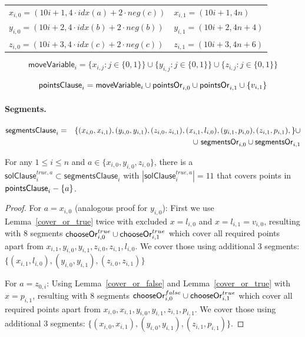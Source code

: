 \begin{center}
\begin{tabular}{ l l }
	$x_{i, 0} = (10i+1, 4\cdot idx(a) + 2\cdot neg(c))$ &
	$x_{i, 1} = (10i+1, 4n)$ \\
	$y_{i, 0} = (10i+2, 4\cdot idx(b) + 2\cdot neg(b))$ &
	$y_{i, 1} = (10i+2, 4n + 4)$ \\
	$z_{i, 0} = (10i+3, 4\cdot idx(c) + 2\cdot neg(c))$ &
	$z_{i, 1} = (10i+3, 4n + 6)$
\end{tabular}
\end{center}

\newcommand{\segmentsClause}{\mathsf{segmentsClause}}	
 
 $$\mathsf{moveVariable}_i = 
 \{x_{i, j} : j \in \{0, 1\}\} \cup
 \{y_{i, j} : j \in \{0, 1\}\} \cup
 \{z_{i, j} : j \in \{0, 1\}\} 
 $$
 
 $$\mathsf{pointsClause}_i = 
 \mathsf{moveVariable}_i \cup \mathsf{pointsOr}_{i,0}
 \cup \mathsf{pointsOr}_{i,1} \cup \{v_{i, 1} \} 
 $$

\paragraph{Segments.}

\begin{eqnarray*}
\segmentsClause_i & = & \{ (x_{i, 0}, x_{i, 1}),
(y_{i, 0}, y_{i, 1}),
(z_{i, 0}, z_{i, 1}),
(x_{i, 1}, l_{i, 0}),
(y_{i, 1}, p_{i, 0}),
(z_{i, 1}, p_{i, 1}),
\} \cup \\
& & \cup \ \segmentsOr{i}{0} \cup \segmentsOr{i}{1}
\end{eqnarray*}

\newcommand{\segmentsClauseSolTrue}[1]{\mathsf{solClause}^{true,#1}}
\newcommand{\segmentsClauseSolFalse}{\mathsf{solClause}^{false}}

\begin{lemma}
\label{cover_clauses_solution_true}
For any $1 \le i \le n$ and $a \in \{ x_{i, 0}, y_{i, 0}, z_{i, 0}\}$,
there is a $\segmentsClauseSolTrue{a}_i \subset \segmentsClause_i$
with $|\segmentsClauseSolTrue{a}_i| = 11$
that covers points in $\mathsf{pointsClause}_i - \{a\}$.
\end{lemma}

\begin{proof}
For $a = x_{i, 0}$ (analogous proof for $y_{i, 0}$):
First we use Lemma~\ref{cover_or_true} twice with excluded $x = l_{i, 0}$ and
$x = l_{i, 1} = v_{i, 0}$,
resulting with 8 segments $\mathsf{chooseOr}^{true}_{i,0} \cup \mathsf{chooseOr}^{true}_{i,1}$
which cover all required points apart from
$x_{i, 1}, y_{i, 0}, y_{i, 1}, z_{i, 0}, z_{i, 1}, l_{i, 0}$.
We cover those using additional 3 segments:
$\{ (x_{i, 1}, l_{i, 0}), (y_{i, 0}, y_{i, 1}),
(z_{i, 0}, z_{i, 1}) \}$

For $a = z_{0, i}$:
Using Lemma~\ref{cover_or_false} and Lemma~\ref{cover_or_true} with
$x = p_{i, 1}$,
resulting with 8 segments $\mathsf{chooseOr}^{false}_{i,0} \cup \mathsf{chooseOr}^{true}_{i,1}$
which cover all required points apart from
$x_{i, 0}, x_{i, 1}, y_{i, 0}, y_{i, 1}, z_{i, 1}, p_{i, 1}$.
We cover those using additional 3 segments:
$\{ (x_{i, 0}, x_{i, 1}), (y_{i, 0}, y_{i, 1}),
(z_{i, 1}, p_{i, 1}) \}$.
\end{proof}

